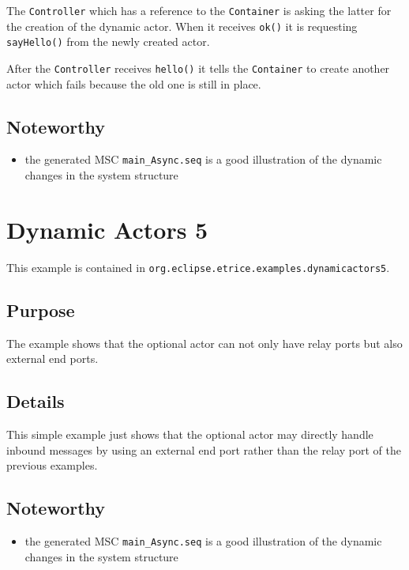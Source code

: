 The \texttt{Controller} which has a reference to the \texttt{Container} is asking the latter
for the creation of the dynamic actor. When it receives \texttt{ok()} it is requesting \texttt{sayHello()}
from the newly created actor.

After the \texttt{Controller} receives \texttt{hello()} it tells the \texttt{Container} to create another
actor which fails because the old one is still in place.

\subsection{Noteworthy}

\begin{itemize}
\item the generated MSC \texttt{main\_Async.seq} is a good illustration of the dynamic changes in the system structure
\end{itemize}

\section{Dynamic Actors 5}

This example is contained in \texttt{org.eclipse.etrice.examples.dynamicactors5}.

\subsection{Purpose}

The example shows that the optional actor can not only have relay ports but also external end ports.

\subsection{Details}

This simple example just shows that the optional actor may directly handle inbound messages by using an
external end port rather than the relay port of the previous examples.

\subsection{Noteworthy}

\begin{itemize}
\item the generated MSC \texttt{main\_Async.seq} is a good illustration of the dynamic changes in the system structure
\end{itemize}

